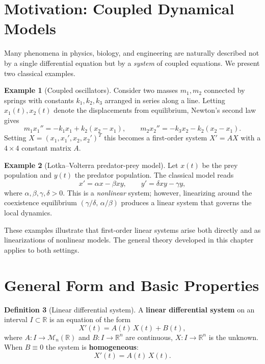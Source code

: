 \documentclass[12pt,a4paper,openany]{book}
\theoremstyle{definition}
\newtheorem{definition}{Definition}[chapter]
\newtheorem{example}[definition]{Example}
\theoremstyle{plain}
\theoremstyle{remark}
\newcommand{\R}{\mathbb{R}}
\begin{document}
\section{Motivation: Coupled Dynamical Models}\label{sec:sys-motivation}

Many phenomena in physics, biology, and engineering are naturally described
not by a single differential equation but by a \emph{system} of coupled
equations.  We present two classical examples.

\begin{example}[Coupled oscillators]\label{ex:coupled-oscillators}
Consider two masses $m_1,m_2$ connected by springs with constants
$k_1,k_2,k_3$ arranged in series along a line.  Letting $x_1(t),x_2(t)$
denote the displacements from equilibrium, Newton's second law gives
\[
  m_1 x_1'' = -k_1 x_1 + k_2(x_2-x_1), \qquad
  m_2 x_2'' = -k_3 x_2 - k_2(x_2-x_1).
\]
Setting $X = (x_1, x_1', x_2, x_2')^T$ this becomes a first-order system
$X' = AX$ with a $4\times 4$ constant matrix $A$.
\end{example}

\begin{example}[Lotka--Volterra predator-prey model]\label{ex:lotka-volterra}
Let $x(t)$ be the prey population and $y(t)$ the predator population.
The classical model reads
\[
  x' = \alpha x - \beta xy, \qquad
  y' = \delta xy - \gamma y,
\]
where $\alpha,\beta,\gamma,\delta>0$.  This is a \emph{nonlinear} system;
however, linearizing around the coexistence equilibrium
$(\gamma/\delta,\,\alpha/\beta)$ produces a linear system that governs the
local dynamics.
\end{example}

\medskip

These examples illustrate that first-order linear systems arise both directly
and as linearizations of nonlinear models.  The general theory developed in
this chapter applies to both settings.

\section{General Form and Basic Properties}\label{sec:sys-general-form}

\begin{definition}[Linear differential system]\label{def:linear-system}
A \textbf{linear differential system} on an interval $I\subset\R$ is an
equation of the form
\begin{equation}\label{eq:sys-nonhom}
  X'(t) = A(t)\,X(t) + B(t),
\end{equation}
where $A:I\to\mathcal{M}_n(\R)$ and $B:I\to\R^n$ are continuous,
$X:I\to\R^n$ is the unknown.  When $B\equiv 0$ the system is
\textbf{homogeneous}:
\begin{equation}\label{eq:sys-hom}
  X'(t) = A(t)\,X(t).
\end{equation}
\end{definition}
\end{document}
